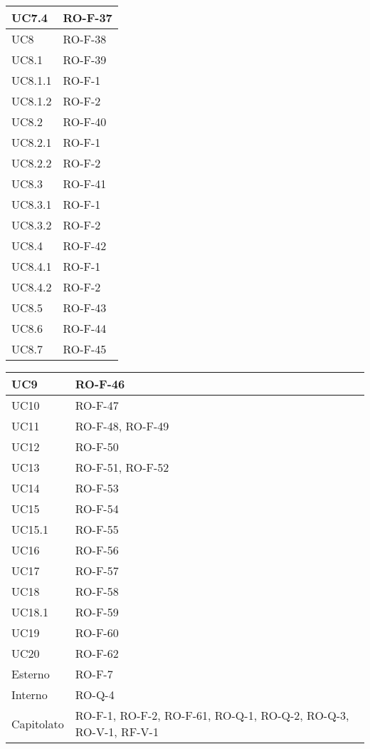 \begin{center}
\begin{tabular}{ |m{8em}|m{13em}| }
    \hline
    UC7.4       &   RO-F-37 \\
    \hline
    UC8         &   RO-F-38 \\
    \hline
    UC8.1       &   RO-F-39 \\
    \hline
    UC8.1.1     &   RO-F-1 \\
    \hline
    UC8.1.2     &   RO-F-2 \\
    \hline
    UC8.2       &   RO-F-40 \\
    \hline
    UC8.2.1     &   RO-F-1 \\
    \hline
    UC8.2.2     &   RO-F-2 \\
    \hline
    UC8.3       &   RO-F-41 \\
    \hline
    UC8.3.1     &   RO-F-1 \\
    \hline
    UC8.3.2     &   RO-F-2 \\
    \hline
    UC8.4       &   RO-F-42 \\
    \hline
    UC8.4.1     &   RO-F-1 \\
    \hline
    UC8.4.2     &   RO-F-2 \\
    \hline
    UC8.5       &   RO-F-43 \\
    \hline
    UC8.6       &   RO-F-44 \\
    \hline
    UC8.7       &   RO-F-45 \\
    \hline
    \end{tabular}
    \newpage
    \begin{tabular}{ |m{8em}|m{13em}| }
    \hline
    UC9         &   RO-F-46 \\
    \hline
    UC10        &   RO-F-47 \\
    \hline
    UC11        &   RO-F-48, RO-F-49 \\
    \hline
    UC12        &   RO-F-50 \\
    \hline
    UC13        &   RO-F-51, RO-F-52 \\
    \hline
    UC14        &   RO-F-53 \\
    \hline
    UC15        &   RO-F-54 \\
    \hline
    UC15.1      &   RO-F-55 \\
    \hline
    UC16        &   RO-F-56 \\
    \hline
    UC17        &   RO-F-57 \\
    \hline
    UC18        &   RO-F-58 \\
    \hline
    UC18.1      &   RO-F-59 \\
    \hline
    UC19        &   RO-F-60 \\
    \hline
    UC20        &   RO-F-62 \\
    \hline
    Esterno     &   RO-F-7 \\
    \hline
    Interno     &   RO-Q-4 \\
    \hline
    Capitolato  &   RO-F-1, RO-F-2, RO-F-61, RO-Q-1, RO-Q-2, RO-Q-3, RO-V-1, RF-V-1 \\
    \hline
\end{tabular}
\end{center}
